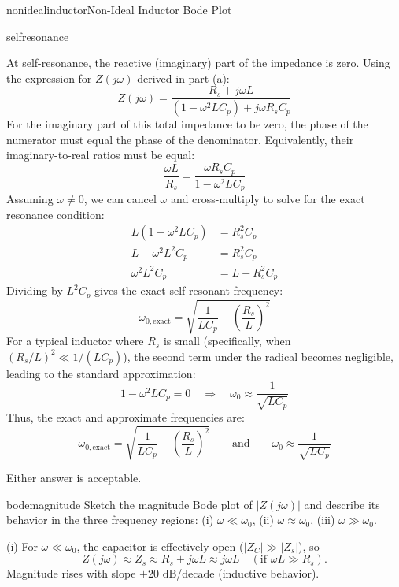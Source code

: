 \begin{mainquestion}{nonidealinductor}{Non-Ideal Inductor Bode Plot}
\begin{partquestion}{selfresonance}
\begin{answer}
At self-resonance, the reactive (imaginary) part of the impedance is zero. Using the expression for $Z(j\omega)$ derived in part (a):
\[
Z(j\omega) = \frac{R_s+j\omega L}{(1-\omega^2 L C_p)+j\omega R_s C_p}
\]
For the imaginary part of this total impedance to be zero, the phase of the numerator must equal the phase of the denominator. Equivalently, their imaginary-to-real ratios must be equal:
\[
\frac{\omega L}{R_s} = \frac{\omega R_s C_p}{1-\omega^2 L C_p}
\]
Assuming $\omega \neq 0$, we can cancel $\omega$ and cross-multiply to solve for the exact resonance condition:
\begin{align*}
L(1-\omega^2 L C_p) &= R_s^2 C_p \\[6pt]
L - \omega^2 L^2 C_p &= R_s^2 C_p \\[6pt]
\omega^2 L^2 C_p &= L - R_s^2 C_p
\end{align*}
Dividing by $L^2 C_p$ gives the exact self-resonant frequency:
\[
\omega_{0,\text{exact}} = \sqrt{\frac{1}{LC_p} - \left(\frac{R_s}{L}\right)^2}
\]
For a typical inductor where $R_s$ is small (specifically, when $(R_s/L)^2 \ll 1/(LC_p)$), the second term under the radical becomes negligible, leading to the standard approximation:
\[
1-\omega^2 L C_p = 0 \quad\Rightarrow\quad \omega_0 \approx \frac{1}{\sqrt{L C_p}}
\]
Thus, the exact and approximate frequencies are:
\[
\boxed{\omega_{0,\text{exact}} = \sqrt{\frac{1}{LC_p} - \left(\frac{R_s}{L}\right)^2}}
\qquad\text{and}\qquad
\boxed{\omega_0 \approx \frac{1}{\sqrt{L C_p}}}
\]

Either answer is acceptable.
\end{answer}

\end{partquestion}

\begin{partquestion}{bodemagnitude}
{Sketch the magnitude Bode plot of $|Z(j\omega)|$ and describe its behavior in the three frequency regions:
(i) $\omega \ll \omega_0$,
(ii) $\omega \approx \omega_0$,
(iii) $\omega \gg \omega_0$.}

\begin{answer}
(i) For $\omega \ll \omega_0$, the capacitor is effectively open ($|Z_C|\gg |Z_s|$), so
\[
Z(j\omega)\approx Z_s \approx R_s + j\omega L \approx j\omega L \quad (\text{if } \omega L \gg R_s).
\]
Magnitude rises with slope $+20$ dB/decade (inductive behavior).


\end{answer}
\end{partquestion}
\end{mainquestion}
